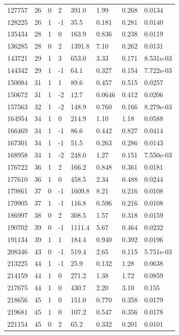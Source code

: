 \documentclass[preview]{standalone}
\begin{document}
{{\begin{tabular}{L{1.2cm}C{1.2cm} C{0.3cm}C{0.5cm} C{1.4cm}C{1.4cm} C{1.4cm}C{1.4cm}}
  127757  &    26  & 0     &  2 &  391.0  & 1.99  & 0.268 &  0.0134   \\ 
  128225  &    26  & 1     & -1 &  35.5  & 0.181  & 0.281 &  0.0140   \\ 
  135434  &    28  & 1     &  0 &  163.9  & 0.836  & 0.238 &  0.0119   \\ 
  136285  &    28  & 0     &  2 &  1391.8  & 7.10  & 0.262 &  0.0131   \\ 
  143721  &    29  & 1     &  3 &  653.0  & 3.33  & 0.171 &  8.531e-03   \\ 
  144342  &    29  & 1     & -1 &  64.1  & 0.327  & 0.154 &  7.722e-03   \\ 
  150084  &    31  & 1     &  1 &  89.6  & 0.457  & 0.515 &  0.0257   \\ 
  150672  &    31  & 1     & -2 &  12.7  & 0.0646  & 0.412 &  0.0206   \\ 
  157563  &    32  & 1     & -2 &  148.9  & 0.760  & 0.166 &  8.279e-03   \\ 
  164954  &    34  & 1     &  0 &  214.9  & 1.10  & 1.18 &  0.0588   \\ 
  166469  &    34  & 1     & -1 &  86.6  & 0.442  & 0.827 &  0.0414   \\ 
  167301  &    34  & 1     & -1 &  51.5  & 0.263  & 0.286 &  0.0143   \\ 
  168958  &    34  & 1     & -2 &  248.0  & 1.27  & 0.151 &  7.550e-03   \\ 
  176722  &    36  & 1     &  2 &  166.2  & 0.848  & 0.361 &  0.0181   \\ 
  177610  &    36  & 1     &  0 &  458.5  & 2.34  & 0.488 &  0.0244   \\ 
  179861  &    37  & 0     & -1 &  1609.8  & 8.21  & 0.216 &  0.0108   \\ 
  179905  &    37  & 1     & -1 &  116.8  & 0.596  & 0.216 &  0.0108   \\ 
  186997  &    38  & 0     &  2 &  308.5  & 1.57  & 0.318 &  0.0159   \\ 
  190702  &    39  & 0     & -1 &  1111.4  & 5.67  & 0.464 &  0.0232   \\ 
  191134  &    39  & 1     &  1 &  184.4  & 0.940  & 0.392 &  0.0196   \\ 
  208346  &    43  & 0     & -1 &  519.4  & 2.65  & 0.115 &  5.751e-03   \\ 
  213225  &    44  & 1     & -1 &  25.9  & 0.132  & 1.28 &  0.0638   \\ 
  214159  &    44  & 1     &  0 &  271.2  & 1.38  & 1.72 &  0.0859   \\ 
  217675  &    44  & 1     &  0 &  430.7  & 2.20  & 3.10 &  0.155   \\ 
  218656  &    45  & 1     &  0 &  151.0  & 0.770  & 0.358 &  0.0179   \\ 
  219681  &    45  & 1     &  0 &  107.2  & 0.547  & 0.356 &  0.0178   \\ 
  221154  &    45  & 0     &  2 &  65.2  & 0.332  & 0.201 &  0.0101   \\ 
\hline 
\end{tabular} 

}}
\end{document}
